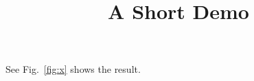 \documentclass[article]{jss}
\title{A Short Demo}
\begin{document}
See Fig.~\ref{fig:x} shows the result.
\end{document}
